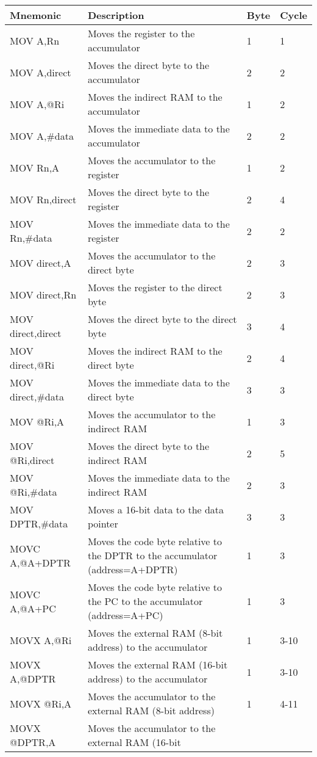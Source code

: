 \documentclass[
]{article}
\begin{document}
\begin{longtable}[]{@{}llll@{}}
\toprule
\textbf{Mnemonic} & \textbf{Description} & \textbf{Byte} &
\textbf{Cycle} \\
\midrule
\endhead
MOV A,Rn & Moves the register to the accumulator & 1 & 1 \\
MOV A,direct & Moves the direct byte to the accumulator & 2 & 2 \\
MOV A,@Ri & Moves the indirect RAM to the accumulator & 1 & 2 \\
MOV A,\#data & Moves the immediate data to the accumulator & 2 & 2 \\
MOV Rn,A & Moves the accumulator to the register & 1 & 2 \\
MOV Rn,direct & Moves the direct byte to the register & 2 & 4 \\
MOV Rn,\#data & Moves the immediate data to the register & 2 & 2 \\
MOV direct,A & Moves the accumulator to the direct byte & 2 & 3 \\
MOV direct,Rn & Moves the register to the direct byte & 2 & 3 \\
MOV direct,direct & Moves the direct byte to the direct byte & 3 & 4 \\
MOV direct,@Ri & Moves the indirect RAM to the direct byte & 2 & 4 \\
MOV direct,\#data & Moves the immediate data to the direct byte & 3 &
3 \\
MOV @Ri,A & Moves the accumulator to the indirect RAM & 1 & 3 \\
MOV @Ri,direct & Moves the direct byte to the indirect RAM & 2 & 5 \\
MOV @Ri,\#data & Moves the immediate data to the indirect RAM & 2 & 3 \\
MOV DPTR,\#data & Moves a 16-bit data to the data pointer & 3 & 3 \\
MOVC A,@A+DPTR & Moves the code byte relative to the DPTR to the
accumulator (address=A+DPTR) & 1 & 3 \\
MOVC A,@A+PC & Moves the code byte relative to the PC to the accumulator
(address=A+PC) & 1 & 3 \\
MOVX A,@Ri & Moves the external RAM (8-bit address) to the accumulator &
1 & 3-10 \\
MOVX A,@DPTR & Moves the external RAM (16-bit address) to the
accumulator & 1 & 3-10 \\
MOVX @Ri,A & Moves the accumulator to the external RAM (8-bit address) &
1 & 4-11 \\
MOVX @DPTR,A & Moves the accumulator to the external RAM (16-bit

\end{longtable}
\end{document}

